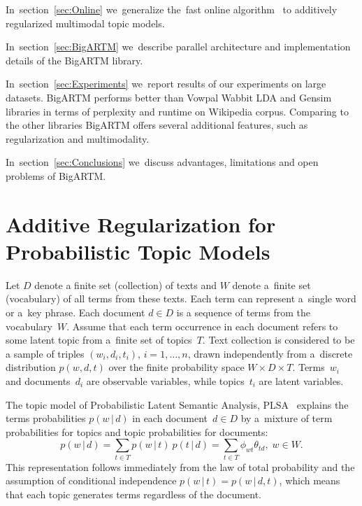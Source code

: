 \documentclass{sig-alternate}
\newcommand{\cond}{\mspace{3mu}{|}\mspace{3mu}}
\begin{document}
In~section~\ref{sec:Online}
we~generalize the~fast online algorithm~\cite{hoffman10online} to additively regularized multimodal topic models.

In~section~\ref{sec:BigARTM}
we~describe parallel architecture and implementation details of the BigARTM library.

In~section~\ref{sec:Experiments}
we~report results of our experiments on large datasets.
BigARTM performs better than Vowpal Wabbit LDA and Gensim libraries
in terms of perplexity and runtime on Wikipedia corpus.
Comparing to the other libraries BigARTM offers several additional features,
such as regularization and multimodality.

In~section~\ref{sec:Conclusions}
we~discuss advantages, limitations and open problems of BigARTM.

\section{Additive Regularization for\\ Probabilistic Topic Models}
\label{sec:ARTM}


Let
$D$ denote a finite set (collection) of texts and
$W$ denote a~finite set (vocabulary) of all terms from these texts.
Each term can represent a~single word or a~key phrase.
Each document ${d\in D}$ is a sequence of terms from the vocabulary~$W$.
Assume that
each term occurrence in each document refers to some latent topic from a~finite set of topics~$T$.
Text collection is considered to be a sample of triples
$(w_i,d_i,t_i)$,\; ${i=1,\dots,n}$,
drawn independently from a~discrete distribution $p(w,d,t)$
over the finite probability space $W\times D \times T$.
Terms~$w_i$ and documents~$d_i$ are observable variables,
while topics~$t_i$ are latent variables.

The topic model of Probabilistic Latent Semantic Analysis, PLSA~\cite{hofmann99plsi}
explains the terms probabilities $p(w\cond d)$ in each document~${d\in D}$
by a~mixture of term probabilities for topics and topic probabilities for documents:
\[
    p(w\cond d)
    = \sum_{t\in T} p(w\cond t)\: p(t\cond d)
    = \sum_{t\in T} \phi_{wt} \theta_{td},\;
    w\in W.
\]
This representation follows immediately from the law of total probability
and the assumption of conditional independence $p(w\cond t) = p(w\cond d,t)$,
which means that each topic generates terms regardless of the document.
\end{document}
